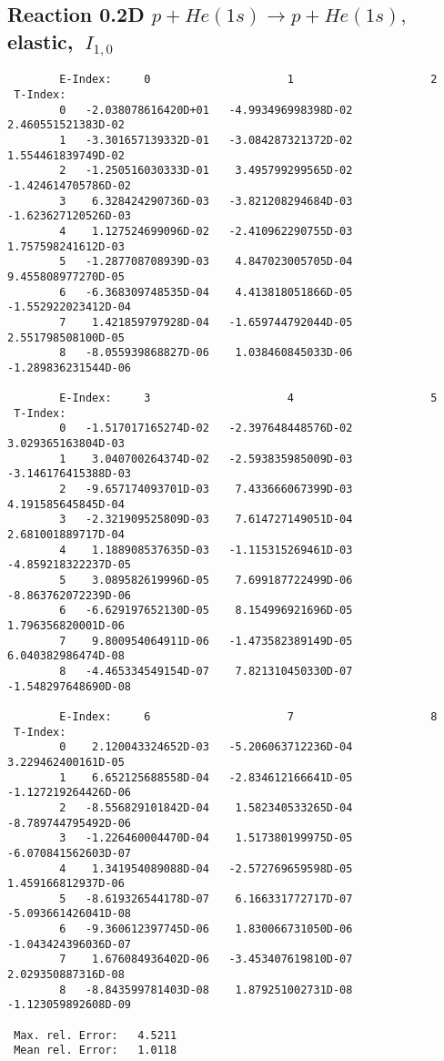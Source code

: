 \documentclass[12pt]{article}
\begin{document}
\subsection{
Reaction 0.2D $ p + He(1s) \rightarrow p + He(1s) ,\  $
elastic, $ \  I_{1,0} $
}

\begin{small}\begin{verbatim}
        E-Index:     0                     1                     2
 T-Index:
        0   -2.038078616420D+01   -4.993496998398D-02    2.460551521383D-02
        1   -3.301657139332D-01   -3.084287321372D-02    1.554461839749D-02
        2   -1.250516030333D-01    3.495799299565D-02   -1.424614705786D-02
        3    6.328424290736D-03   -3.821208294684D-03   -1.623627120526D-03
        4    1.127524699096D-02   -2.410962290755D-03    1.757598241612D-03
        5   -1.287708708939D-03    4.847023005705D-04    9.455808977270D-05
        6   -6.368309748535D-04    4.413818051866D-05   -1.552922023412D-04
        7    1.421859797928D-04   -1.659744792044D-05    2.551798508100D-05
        8   -8.055939868827D-06    1.038460845033D-06   -1.289836231544D-06

        E-Index:     3                     4                     5
 T-Index:
        0   -1.517017165274D-02   -2.397648448576D-02    3.029365163804D-03
        1    3.040700264374D-02   -2.593835985009D-03   -3.146176415388D-03
        2   -9.657174093701D-03    7.433666067399D-03    4.191585645845D-04
        3   -2.321909525809D-03    7.614727149051D-04    2.681001889717D-04
        4    1.188908537635D-03   -1.115315269461D-03   -4.859218322237D-05
        5    3.089582619996D-05    7.699187722499D-06   -8.863762072239D-06
        6   -6.629197652130D-05    8.154996921696D-05    1.796356820001D-06
        7    9.800954064911D-06   -1.473582389149D-05    6.040382986474D-08
        8   -4.465334549154D-07    7.821310450330D-07   -1.548297648690D-08

        E-Index:     6                     7                     8
 T-Index:
        0    2.120043324652D-03   -5.206063712236D-04    3.229462400161D-05
        1    6.652125688558D-04   -2.834612166641D-05   -1.127219264426D-06
        2   -8.556829101842D-04    1.582340533265D-04   -8.789744795492D-06
        3   -1.226460004470D-04    1.517380199975D-05   -6.070841562603D-07
        4    1.341954089088D-04   -2.572769659598D-05    1.459166812937D-06
        5   -8.619326544178D-07    6.166331772717D-07   -5.093661426041D-08
        6   -9.360612397745D-06    1.830066731050D-06   -1.043424396036D-07
        7    1.676084936402D-06   -3.453407619810D-07    2.029350887316D-08
        8   -8.843599781403D-08    1.879251002731D-08   -1.123059892608D-09

 Max. rel. Error:   4.5211
 Mean rel. Error:   1.0118
\end{verbatim}\end{small}
\end{document}
